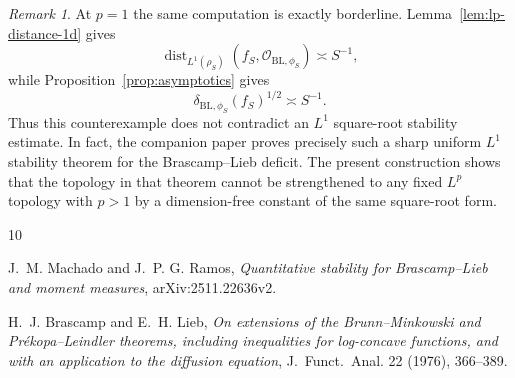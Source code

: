 \documentclass[11pt]{amsart}
\theoremstyle{remark}
\newtheorem{remark}[theorem]{Remark}
\DeclareMathOperator{\dist}{dist}
\newcommand{\cO}{\mathcal O}
\newcommand{\BL}{\mathrm{BL}}
\begin{document}
\begin{remark}
At $p=1$ the same computation is exactly borderline. Lemma~\ref{lem:lp-distance-1d}
gives
\[
  \dist_{L^1(\rho_S)}(f_S,\cO_{\BL,\phi_S})
  \asymp S^{-1},
\]
while Proposition~\ref{prop:asymptotics} gives
\[
  \delta_{\BL,\phi_S}(f_S)^{1/2}\asymp S^{-1}.
\]
Thus this counterexample does not contradict an $L^1$ square-root stability
estimate. In fact, the companion paper \cite{BLpaper} proves precisely such a
sharp uniform $L^1$ stability theorem for the Brascamp--Lieb deficit. The
present construction shows that the topology in that theorem cannot be
strengthened to any fixed $L^p$ topology with $p>1$ by a dimension-free
constant of the same square-root form.
\end{remark}

\begin{thebibliography}{10}

J.~M. Machado and J.~P. G. Ramos,
\textit{Quantitative stability for Brascamp--Lieb and moment measures},
arXiv:2511.22636v2.

H.~J. Brascamp and E.~H. Lieb,
\textit{On extensions of the Brunn--Minkowski and Pr\'ekopa--Leindler theorems,
including inequalities for log-concave functions, and with an application to
the diffusion equation},
J.~Funct.~Anal. 22 (1976), 366--389.

\end{thebibliography}
\end{document}
